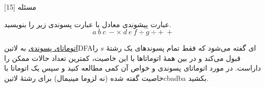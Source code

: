 ‌مسئله [15]


% 
%
%
% 
عبارت پیشوندی معادل با عبارت پسوندی زیر را بنویسید.
$$a\: b\: c\: - \times \: d\: e\: f \div  g \div +\: +$$

\href{https://cp-algorithms.com/string/suffix-automaton.html}{اتوماتای پسوندی}
به ‌لاتین{DFA}ای گفته می‌شود که فقط تمام پسوندهای یک رشتۀ $s$ را قبول می‌کند و در بین همۀ اتوماتاها با این خاصیت، کمترین تعداد حالات ممکن را داراست. در مورد اتوماتای پسوندی و خواص آن کمی مطالعه کنید و سپس یک اتوماتا با خاصیت گفته شده (نه لزوما مینیمال) برای رشتۀ ‌لاتین{cbadba} بکشید.




